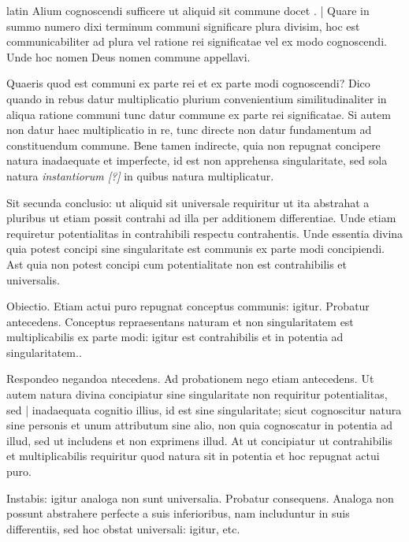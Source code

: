 \begin{otherlanguage*}{latin}
\pstart
Alium cognoscendi sufficere ut aliquid sit commune docet . \textnormal{|} Quare in summo numero dixi terminum communi significare plura divisim, hoc est communicabiliter ad plura vel ratione rei significatae vel ex modo cognoscendi. Unde hoc nomen Deus nomen commune appellavi. 
\pend

\pstart
Quaeris quod est communi ex parte rei et ex parte modi cognoscendi? Dico quando in rebus datur multiplicatio plurium convenientium similitudinaliter in aliqua ratione communi tunc datur commune ex parte rei significatae. Si autem non datur haec multiplicatio in re, tunc directe non datur fundamentum ad constituendum commune. Bene tamen indirecte, quia non repugnat concipere natura inadaequate et imperfecte, id est non apprehensa singularitate, sed sola natura \emph{instantiorum [?]} in quibus natura multiplicatur. 
\pend

\pstart
Sit secunda conclusio:
ut aliquid sit universale requiritur ut ita abstrahat a pluribus ut etiam possit contrahi ad illa per additionem differentiae. Unde etiam requiretur potentialitas in contrahibili respectu contrahentis. Unde essentia divina quia potest concipi sine singularitate est communis ex parte modi concipiendi. Ast quia non potest concipi cum potentialitate non est contrahibilis et universalis. 
\pend

\pstart
Obiectio. Etiam actui puro repugnat conceptus communis:
igitur. Probatur antecedens. Conceptus repraesentans naturam et non singularitatem est multiplicabilis ex parte modi:
igitur est contrahibilis et in potentia ad singularitatem.. 
\pend

\pstart
Respondeo negandoa ntecedens. Ad probationem nego etiam antecedens. Ut autem natura divina concipiatur sine singularitate non requiritur potentialitas, sed \textnormal{|} inadaequata cognitio illius, id est sine singularitate; sicut cognoscitur natura sine personis et unum attributum sine alio, non quia cognoscatur in potentia ad illud, sed ut includens et non exprimens illud. At ut concipiatur ut contrahibilis et multiplicabilis requiritur quod natura sit in potentia et hoc repugnat actui puro. 
\pend

\pstart
Instabis:
igitur analoga non sunt universalia. Probatur consequens. Analoga non possunt abstrahere perfecte a suis inferioribus, nam includuntur in suis differentiis, sed hoc obstat universali:
igitur, etc. 
\pend


\end{otherlanguage*}
